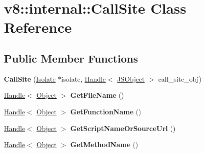 \hypertarget{classv8_1_1internal_1_1_call_site}{}\section{v8\+:\+:internal\+:\+:Call\+Site Class Reference}
\label{classv8_1_1internal_1_1_call_site}
\subsection*{Public Member Functions}
\begin{DoxyCompactItemize}
\item 
{\bfseries Call\+Site} (\hyperlink{classv8_1_1internal_1_1_isolate}{Isolate} $\ast$isolate, \hyperlink{classv8_1_1internal_1_1_handle}{Handle}$<$ \hyperlink{classv8_1_1internal_1_1_j_s_object}{J\+S\+Object} $>$ call\+\_\+site\+\_\+obj)\hypertarget{classv8_1_1internal_1_1_call_site_aaffefacd06bccda75d730ee61e576376}{}\label{classv8_1_1internal_1_1_call_site_aaffefacd06bccda75d730ee61e576376}

\item 
\hyperlink{classv8_1_1internal_1_1_handle}{Handle}$<$ \hyperlink{classv8_1_1internal_1_1_object}{Object} $>$ {\bfseries Get\+File\+Name} ()\hypertarget{classv8_1_1internal_1_1_call_site_abf7414acf7d23c76f37b4396668dfe9d}{}\label{classv8_1_1internal_1_1_call_site_abf7414acf7d23c76f37b4396668dfe9d}

\item 
\hyperlink{classv8_1_1internal_1_1_handle}{Handle}$<$ \hyperlink{classv8_1_1internal_1_1_object}{Object} $>$ {\bfseries Get\+Function\+Name} ()\hypertarget{classv8_1_1internal_1_1_call_site_aaaf416f5473e11512567c4bc26b3aed7}{}\label{classv8_1_1internal_1_1_call_site_aaaf416f5473e11512567c4bc26b3aed7}

\item 
\hyperlink{classv8_1_1internal_1_1_handle}{Handle}$<$ \hyperlink{classv8_1_1internal_1_1_object}{Object} $>$ {\bfseries Get\+Script\+Name\+Or\+Source\+Url} ()\hypertarget{classv8_1_1internal_1_1_call_site_a60c0a0153c349661e9b17027f9d3d158}{}\label{classv8_1_1internal_1_1_call_site_a60c0a0153c349661e9b17027f9d3d158}

\item 
\hyperlink{classv8_1_1internal_1_1_handle}{Handle}$<$ \hyperlink{classv8_1_1internal_1_1_object}{Object} $>$ {\bfseries Get\+Method\+Name} ()\hypertarget{classv8_1_1internal_1_1_call_site_a46eabcfb20c22616944b40b18e843c26}{}\label{classv8_1_1internal_1_1_call_site_a46eabcfb20c22616944b40b18e843c26}


\end{DoxyCompactItemize}
